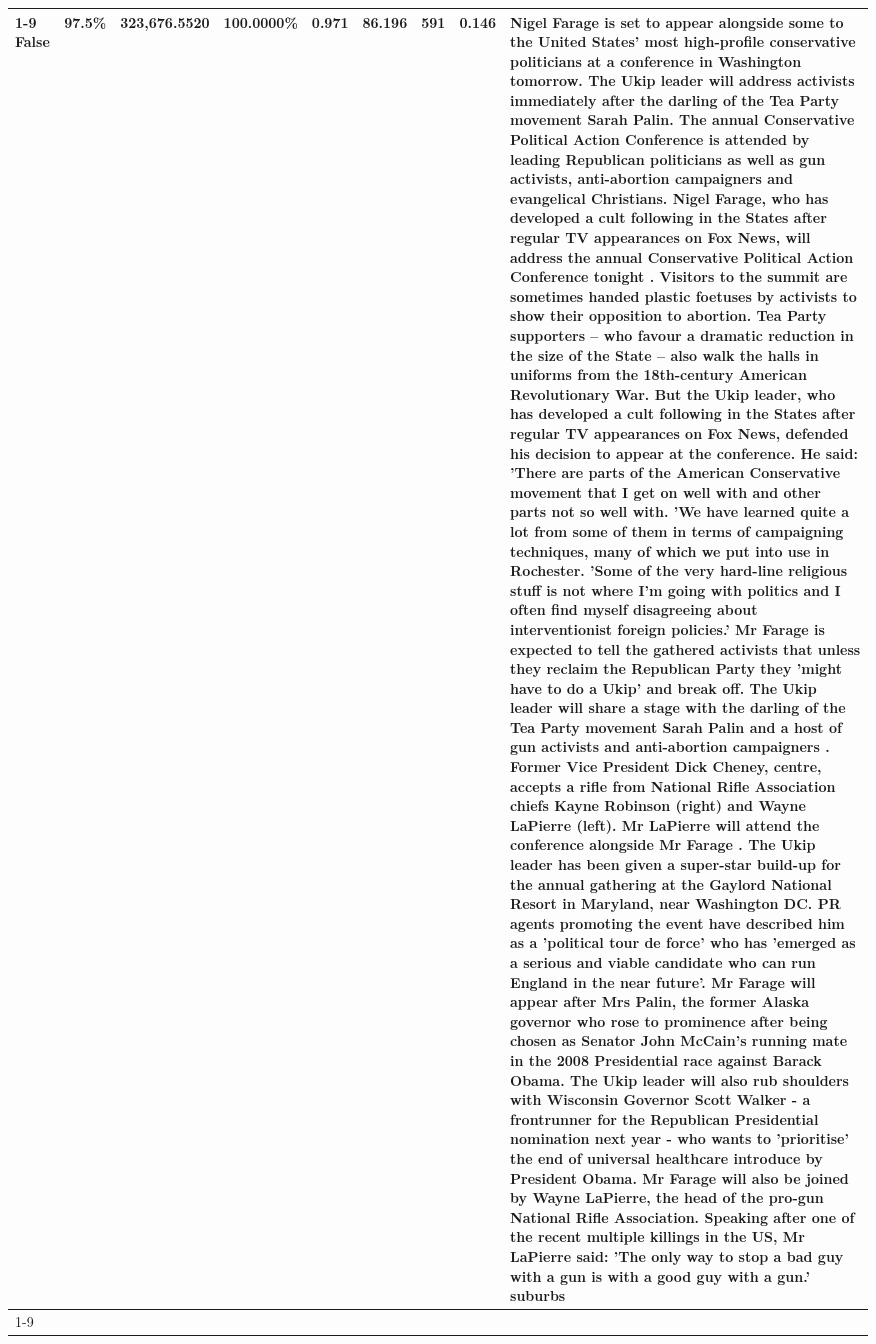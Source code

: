 \begin{table}[H]
\begin{tabular}{lllrlllll}
\cline{1-9} \cline{2-9}
False & 97.5\% & 323,676.5520 & \bfseries \color{red} 100.0000\% & 0.971 & 86.196 & 591 & 0.146 & Nigel Farage is set to appear alongside some to the United States' most high-profile conservative politicians at a conference in Washington tomorrow. The Ukip leader will address activists immediately after the darling of the Tea Party movement Sarah Palin. The annual Conservative Political Action Conference is attended by leading Republican politicians as well as gun activists, anti-abortion campaigners and evangelical Christians. Nigel Farage, who has developed a cult following in the States after regular TV appearances on Fox News, will address the annual Conservative Political Action Conference tonight . Visitors to the summit are sometimes handed plastic foetuses by activists to show their opposition to abortion. Tea Party supporters – who favour a dramatic reduction in the size of the State – also walk the halls in uniforms from the 18th-century American Revolutionary War. But the Ukip leader, who has developed a cult following in the States after regular TV appearances on Fox News, defended his decision to appear at the conference. He said: 'There are parts of the American Conservative movement that I get on well with and other parts not so well with. 'We have learned quite a lot from some of them in terms of campaigning techniques, many of which we put into use in Rochester. 'Some of the very hard-line religious stuff is not where I'm going with politics and I often find myself disagreeing about interventionist foreign policies.' Mr Farage is expected to tell the gathered activists that unless they reclaim the Republican Party they 'might have to do a Ukip' and break off. The Ukip leader will share a stage with the darling of the Tea Party movement Sarah Palin and a host of gun activists and anti-abortion campaigners . Former Vice President Dick Cheney, centre, accepts a rifle from National Rifle Association chiefs Kayne Robinson (right) and Wayne LaPierre (left). Mr LaPierre will attend the conference alongside Mr Farage . The Ukip leader has been given a super-star build-up for the annual gathering at the Gaylord National Resort in Maryland, near Washington DC. PR agents promoting the event have described him as a 'political tour de force' who has 'emerged as a serious and viable candidate who can run England in the near future'. Mr Farage will appear after Mrs Palin, the former Alaska governor who rose to prominence after being chosen as Senator John McCain's running mate in the 2008 Presidential race against Barack Obama. The Ukip leader will also rub shoulders with Wisconsin Governor Scott Walker - a frontrunner for the Republican Presidential nomination next year - who wants to 'prioritise' the end of universal healthcare introduce by President Obama. Mr Farage will also be joined by Wayne LaPierre, the head of the pro-gun National Rifle Association. Speaking after one of the recent multiple killings in the US, Mr LaPierre said: 'The only way to stop a bad guy with a gun is with a good guy with a gun.' suburbs \\
\cline{1-9} \cline{2-9}
\bottomrule
\end{tabular}
\end{table}
